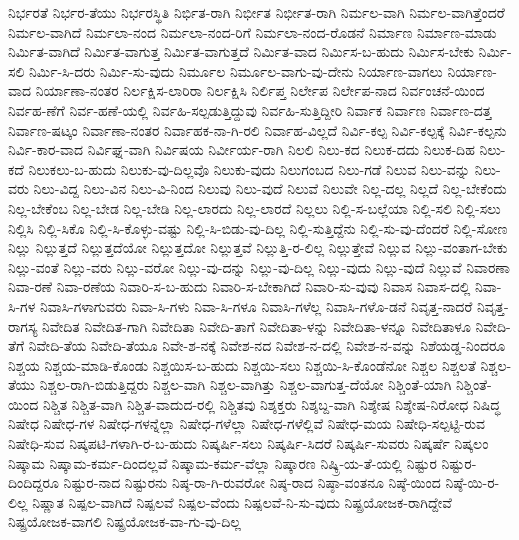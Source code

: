 {ನಿರ್ಭರತೆ
ನಿರ್ಭರ-ತೆಯು
ನಿರ್ಭರಸ್ಥಿತಿ
ನಿರ್ಭಿತ-ರಾಗಿ
ನಿರ್ಭೀತ
ನಿರ್ಭೀತ-ರಾಗಿ
ನಿರ್ಮಲ-ವಾಗಿ
ನಿರ್ಮಲ-ವಾಗಿತ್ತೆಂದರೆ
ನಿರ್ಮಲ-ವಾಗಿದೆ
ನಿರ್ಮಲಾ-ನಂದ
ನಿರ್ಮಲಾ-ನಂದ-ರಿಗೆ
ನಿರ್ಮಲಾ-ನಂದ-ರೊಡನೆ
ನಿರ್ಮಾಣ
ನಿರ್ಮಾಣ-ಮಾಡು
ನಿರ್ಮಿತ-ವಾಗಿದೆ
ನಿರ್ಮಿತ-ವಾಗುತ್ತ
ನಿರ್ಮಿತ-ವಾಗುತ್ತದೆ
ನಿರ್ಮಿತ-ವಾದ
ನಿರ್ಮಿಸ-ಬ-ಹುದು
ನಿರ್ಮಿಸ-ಬೇಕು
ನಿರ್ಮಿ-ಸಲಿ
ನಿರ್ಮಿ-ಸಿ-ದರು
ನಿರ್ಮಿ-ಸು-ವುದು
ನಿರ್ಮೂಲ
ನಿರ್ಮೂಲ-ವಾಗು-ವು-ದೇನು
ನಿರ್ಯಾಣ-ವಾಗಲು
ನಿರ್ಯಾಣ-ವಾದ
ನಿರ್ಯಾಣಾ-ನಂತರ
ನಿರ್ಲಕ್ಷಿಸ-ಲಾರಿರಾ
ನಿರ್ಲಕ್ಷಿಸಿ
ನಿರ್ಲಿಪ್ತ
ನಿರ್ಲೇಪ
ನಿರ್ಲೇಪ-ನಾದ
ನಿರ್ವಂಚನೆ-ಯಿಂದ
ನಿರ್ವಹ-ಣೆಗೆ
ನಿರ್ವ-ಹಣೆ-ಯಲ್ಲಿ
ನಿರ್ವಹಿ-ಸಲ್ಪಡುತ್ತಿದ್ದುವು
ನಿರ್ವಹಿ-ಸುತ್ತಿದ್ದೀರಿ
ನಿರ್ವಾಕ
ನಿರ್ವಾಣ
ನಿರ್ವಾಣ-ದತ್ತ
ನಿರ್ವಾಣ-ಷಟ್ಕಂ
ನಿರ್ವಾಣಾ-ನಂತರ
ನಿರ್ವಾಹಕ-ನಾ-ಗಿ-ರಲಿ
ನಿರ್ವಾಹ-ವಿಲ್ಲದೆ
ನಿರ್ವಿ-ಕಲ್ಪ
ನಿರ್ವಿ-ಕಲ್ಪಕ್ಕೆ
ನಿರ್ವಿ-ಕಲ್ಪನು
ನಿರ್ವಿ-ಕಾರ-ವಾದ
ನಿರ್ವಿಘ್ನ-ವಾಗಿ
ನಿರ್ವಿಷಯ
ನಿರ್ವೀರ್ಯ-ರಾಗಿ
ನಿಲಲಿ
ನಿಲು-ಕದ
ನಿಲುಕ-ದದು
ನಿಲುಕ-ದಿಹ
ನಿಲು-ಕದೆ
ನಿಲುಕಲು-ಬ-ಹುದು
ನಿಲುಕು-ವು-ದಿಲ್ಲವೊ
ನಿಲುಕು-ವುದು
ನಿಲುಗಂಬದ
ನಿಲು-ಗಡೆ
ನಿಲುವ
ನಿಲು-ವನ್ನು
ನಿಲು-ವರು
ನಿಲು-ವಿದ್ದ
ನಿಲು-ವಿನ
ನಿಲು-ವಿ-ನಿಂದ
ನಿಲುವು
ನಿಲು-ವುದೆ
ನಿಲುವೆ
ನಿಲುವೇ
ನಿಲ್ಲ-ದಲ್ಲ
ನಿಲ್ಲದೆ
ನಿಲ್ಲ-ಬೇಕೆಂದು
ನಿಲ್ಲ-ಬೇಕೆಂಬ
ನಿಲ್ಲ-ಬೇಡ
ನಿಲ್ಲ-ಬೇಡಿ
ನಿಲ್ಲ-ಲಾರದು
ನಿಲ್ಲ-ಲಾರದೆ
ನಿಲ್ಲಲು
ನಿಲ್ಲಿ-ಸ-ಬಲ್ಲೆಯಾ
ನಿಲ್ಲಿ-ಸಲಿ
ನಿಲ್ಲಿ-ಸಲು
ನಿಲ್ಲಿಸಿ
ನಿಲ್ಲಿ-ಸಿಕೊ
ನಿಲ್ಲಿ-ಸಿ-ಕೊಳ್ಳು-ವಷ್ಟು
ನಿಲ್ಲಿ-ಸಿ-ಬಿಡು-ವು-ದಿಲ್ಲ
ನಿಲ್ಲಿ-ಸುತ್ತಿದ್ದೆನು
ನಿಲ್ಲಿ-ಸು-ವು-ದೆಂದರೆ
ನಿಲ್ಲಿ-ಸೋಣ
ನಿಲ್ಲು
ನಿಲ್ಲುತ್ತದೆ
ನಿಲ್ಲುತ್ತದೆಯೋ
ನಿಲ್ಲುತ್ತದೋ
ನಿಲ್ಲುತ್ತವೆ
ನಿಲ್ಲುತ್ತಿ-ರ-ಲಿಲ್ಲ
ನಿಲ್ಲುತ್ತೇವೆ
ನಿಲ್ಲುವ
ನಿಲ್ಲು-ವಂತಾಗ-ಬೇಕು
ನಿಲ್ಲು-ವಂತೆ
ನಿಲ್ಲು-ವರು
ನಿಲ್ಲು-ವರೋ
ನಿಲ್ಲು-ವು-ದನ್ನು
ನಿಲ್ಲು-ವು-ದಿಲ್ಲ
ನಿಲ್ಲು-ವುದು
ನಿಲ್ಲು-ವುದೆ
ನಿಲ್ಲುವೆ
ನಿವಾರಣಾ
ನಿವಾ-ರಣೆ
ನಿವಾ-ರಣೆಯ
ನಿವಾರಿ-ಸ-ಬ-ಹುದು
ನಿವಾರಿ-ಸ-ಬೇಕಾಗಿದೆ
ನಿವಾರಿ-ಸು-ವುವು
ನಿವಾಸ
ನಿವಾಸ-ದಲ್ಲಿ
ನಿವಾ-ಸಿ-ಗಳ
ನಿವಾಸಿ-ಗಳಾಗುವರು
ನಿವಾ-ಸಿ-ಗಳು
ನಿವಾ-ಸಿ-ಗಳೂ
ನಿವಾಸಿ-ಗಳೆಲ್ಲ
ನಿವಾಸಿ-ಗಳೊ-ಡನೆ
ನಿವೃತ್ತ-ನಾದರೆ
ನಿವೃತ್ತ-ರಾಗಸ್ಯ
ನಿವೇದಿತ
ನಿವೇದಿತ-ಗಾಗಿ
ನಿವೇದಿತಾ
ನಿವೇದಿ-ತಾಗೆ
ನಿವೇದಿತಾ-ಳನ್ನು
ನಿವೇದಿತಾ-ಳನ್ನೂ
ನಿವೇದಿತಾಳೂ
ನಿವೇದಿ-ತೆಗೆ
ನಿವೇದಿ-ತೆಯ
ನಿವೇದಿ-ತೆಯೂ
ನಿವೇ-ಶ-ನಕ್ಕೆ
ನಿವೇಶ-ನದ
ನಿವೇಶ-ನ-ದಲ್ಲಿ
ನಿವೇಶ-ನ-ವನ್ನು
ನಿಶೆಯಡ್ಡ-ನಿಂದರೂ
ನಿಶ್ಚಯ
ನಿಶ್ಚಯ-ಮಾಡಿ-ಕೊಂಡು
ನಿಶ್ಚಯಿಸ-ಬ-ಹುದು
ನಿಶ್ಚಯಿ-ಸಲು
ನಿಶ್ಚಯಿ-ಸಿ-ಕೊಂಡೆನೋ
ನಿಶ್ಚಲ
ನಿಶ್ಚಲತೆ
ನಿಶ್ಚಲ-ತೆಯು
ನಿಶ್ಚಲ-ರಾಗಿ-ಬಿಡುತ್ತಿದ್ದರು
ನಿಶ್ಚಲ-ವಾಗಿ
ನಿಶ್ಚಲ-ವಾಗಿತ್ತು
ನಿಶ್ಚಲ-ವಾಗುತ್ತ-ದೆಯೋ
ನಿಶ್ಚಿಂತೆ-ಯಾಗಿ
ನಿಶ್ಚಿಂತೆ-ಯಿಂದ
ನಿಶ್ಚಿತ
ನಿಶ್ಚಿತ-ವಾಗಿ
ನಿಶ್ಚಿತ-ವಾದುದ-ರಲ್ಲಿ
ನಿಶ್ಚಿತವು
ನಿಶ್ಶಕ್ತರು
ನಿಶ್ಶಬ್ದ-ವಾಗಿ
ನಿಶ್ಶೇಷ
ನಿಶ್ಶೇಷ-ನಿರೋಧ
ನಿಷಿದ್ಧ
ನಿಷೇಧ
ನಿಷೇಧ-ಗಳ
ನಿಷೇಧ-ಗಳನ್ನೆಲ್ಲಾ
ನಿಷೇಧ-ಗಳೆಲ್ಲಾ
ನಿಷೇಧ-ಗಳೆಲ್ಲಿವೆ
ನಿಷೇಧ-ಮಯ
ನಿಷೇಧಿ-ಸಲ್ಪಟ್ಟಿ-ರುವ
ನಿಷೇಧಿ-ಸುವ
ನಿಷ್ಕಪಟಿ-ಗಳಾಗಿ-ರ-ಬ-ಹುದು
ನಿಷ್ಕರ್ಷಿ-ಸಲು
ನಿಷ್ಕರ್ಷಿ-ಸಿದರೆ
ನಿಷ್ಕರ್ಷಿ-ಸುವರು
ನಿಷ್ಕರ್ಷೆ
ನಿಷ್ಕಲಂ
ನಿಷ್ಕಾಮ
ನಿಷ್ಕಾಮ-ಕರ್ಮ-ದಿಂದಲ್ಲವೆ
ನಿಷ್ಕಾಮ-ಕರ್ಮ-ವೆಲ್ಲಾ
ನಿಷ್ಕಾರಣ
ನಿಷ್ಕ್ರಿ-ಯ-ತೆ-ಯಲ್ಲಿ
ನಿಷ್ಟುರ
ನಿಷ್ಟುರ-ದಿಂದಿದ್ದರೂ
ನಿಷ್ಟುರ-ನಾದ
ನಿಷ್ಟುರನು
ನಿಷ್ಠ-ರಾ-ಗಿ-ರುವರೋ
ನಿಷ್ಠ-ರಾದ
ನಿಷ್ಠಾ-ವಂತನೂ
ನಿಷ್ಠೆ-ಯಿಂದ
ನಿಷ್ಠೆ-ಯಿ-ರ-ಲಿಲ್ಲ
ನಿಷ್ಣಾತ
ನಿಷ್ಪಲ-ವಾಗಿದೆ
ನಿಷ್ಪಲವೆ
ನಿಷ್ಪಲ-ವೆಂದು
ನಿಷ್ಪಲವೆ-ನಿ-ಸು-ವುದು
ನಿಷ್ಪ್ರಯೋಜಕ-ರಾಗಿದ್ದೇವೆ
ನಿಷ್ಪ್ರಯೋಜಕ-ವಾಗಲಿ
ನಿಷ್ಪ್ರಯೋಜಕ-ವಾ-ಗು-ವು-ದಿಲ್ಲ
}

